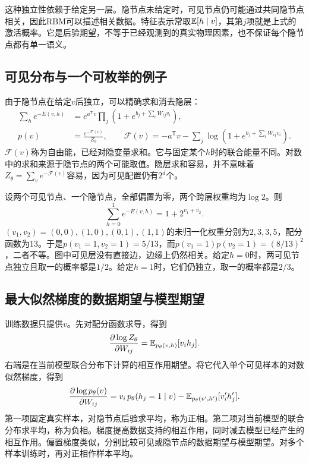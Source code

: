 这种独立性依赖于给定另一层。隐节点未给定时，可见节点仍可能通过共同隐节点相关，因此RBM可以描述相关数据。特征表示常取$\mathbb{E}[h\mid v]$，其第$j$项就是上式的激活概率。它是后验期望，不等于已经观测到的真实物理因素，也不保证每个隐节点都有单一语义。

\subsection{可见分布与一个可枚举的例子}
由于隐节点在给定$v$后独立，可以精确求和消去隐层：
\begin{align}
 \sum_h e^{-E(v,h)}
 &=e^{a^{\mathsf T}v}\prod_j\left(1+e^{b_j+\sum_iW_{ij}v_i}\right),\\
 p(v)&=\frac{e^{-\mathcal F(v)}}{Z_\theta},\qquad
 \mathcal F(v)=-a^{\mathsf T}v-\sum_j\log\left(1+e^{b_j+\sum_iW_{ij}v_i}\right).
 \label{eq:bayes-rbm-free-energy}
\end{align}
$\mathcal F(v)$称为自由能，已经对隐变量求和。它与固定某个$h$时的联合能量不同。对数中的求和来源于隐节点的两个可能取值。隐层求和容易，并不意味着$Z_\theta=\sum_v e^{-\mathcal F(v)}$容易，因为可见配置仍有$2^d$个。

设两个可见节点、一个隐节点，全部偏置为零，两个跨层权重均为$\log2$。则
\begin{equation}
 \sum_{h=0}^1e^{-E(v,h)}=1+2^{v_1+v_2}.
\end{equation}
$(v_1,v_2)=(0,0),(1,0),(0,1),(1,1)$的未归一化权重分别为$2,3,3,5$，配分函数为$13$。于是$p(v_1=1,v_2=1)=5/13$，而$p(v_1=1)p(v_2=1)=(8/13)^2$，二者不等。图中可见层没有直接边，边缘上仍然相关。给定$h=0$时，两可见节点独立且取一的概率都是$1/2$。给定$h=1$时，它们仍独立，取一的概率都是$2/3$。

\subsection{最大似然梯度的数据期望与模型期望}
训练数据只提供$v$。先对配分函数求导，得到
\[
 \frac{\partial\log Z_\theta}{\partial W_{ij}}
 =\mathbb{E}_{p_\theta(v,h)}[v_ih_j].
\]
右端是在当前模型联合分布下计算的相互作用期望。将它代入单个可见样本的对数似然梯度，得到
\begin{equation}
 \frac{\partial\log p_\theta(v)}{\partial W_{ij}}
 =v_i\,p_\theta(h_j=1\mid v)
 -\mathbb{E}_{p_\theta(v',h')}[v_i'h_j'].
 \label{eq:bayes-rbm-gradient}
\end{equation}
第一项固定真实样本，对隐节点后验求平均，称为正相。第二项对当前模型的联合分布求平均，称为负相。梯度提高数据支持的相互作用，同时减去模型已经产生的相互作用。偏置梯度类似，分别比较可见或隐节点的数据期望与模型期望。对多个样本训练时，再对正相作样本平均。

